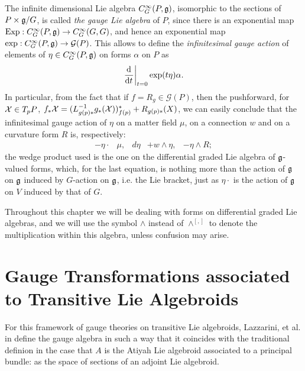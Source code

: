 The infinite dimensional Lie algebra $C^\infty_G(P, \mathfrak{g})$, isomorphic to the sections of $P \times \mathfrak{g}/G$, is called \emph{the gauge Lie algebra} of $P$, since there is an exponential map $\text{Exp}: C^\infty_G(P, \mathfrak{g}) \to C^\infty_G(G, G)$, and hence an exponential map $\text{exp}: C^\infty_G(P, \mathfrak{g}) \to \mathcal G(P)$. This allows to define the \emph{infinitesimal gauge action} of elements of $\eta \in C^\infty_G(P, \mathfrak{g})$ on forms $\alpha$ on $P$ as
\begin{equation}
    \der{t}[t=0]{\text{exp}(t\eta)} \alpha.
\end{equation}
In particular, from the fact that if $f = R_g \in \mathcal G(P)$, then the pushforward, for $\mathcal{X} \in T_pP$, $f_* \mathcal{X} = (L_{g(p) *}^{-1} g_*(\mathcal{X}))^*_{f(p)} + R_{g(p)*}(X)$, we can easily conclude that the infinitesimal gauge action of $\eta$ on a matter field $\mu$, on a connection $w$ and on a curvature form $R$ is, respectively:
\begin{align}
    -\eta \cdot & \mu, &
    d\eta &+ w \wedge \eta, &
    - \eta \wedge  R;
\end{align}
the wedge product used is the one on the differential graded Lie algebra of $\mathfrak{g}$-valued forms, which, for the last equation, is nothing more than the action of $\mathfrak{g}$ on $\mathfrak{g}$ induced by $G$-action on $\mathfrak{g}$, i.e. the Lie bracket, just as $\eta \cdot$ is the action of $\mathfrak{g}$ on $V$ induced by that of $G$. 

Throughout this chapter we will be dealing with forms on differential graded Lie algebras, and we will use the symbol $\wedge$ instead of $\wedge^{[,]}$ to denote the multiplication within this algebra, unless confusion may arise.

\section{Gauge Transformations associated to Transitive Lie Algebroids}

For this framework of gauge theories on transitive Lie algebroids, Lazzarini, et al. in \cite{2012} define the gauge algebra in such a way that it coincides with the traditional definion in the case that $A$ is the Atiyah Lie algebroid associated to a principal bundle: as the space of sections of an adjoint Lie algebroid.


